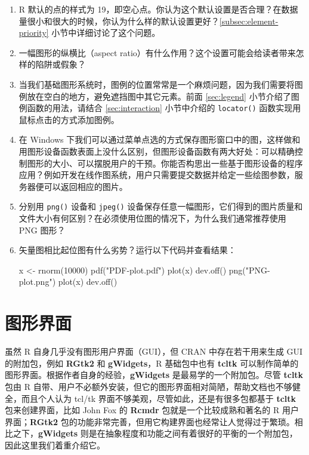 \documentclass[
  b5paper,
  UTF8,twoside]{book}
\newenvironment{Shaded}{\begin{snugshade}}{\end{snugshade}}
\newcommand{\DecValTok}[1]{\textcolor[rgb]{0.00,0.00,0.81}{#1}}
\newcommand{\FunctionTok}[1]{\textcolor[rgb]{0.00,0.00,0.00}{#1}}
\newcommand{\NormalTok}[1]{#1}
\newcommand{\OtherTok}[1]{\textcolor[rgb]{0.56,0.35,0.01}{#1}}
\newcommand{\StringTok}[1]{\textcolor[rgb]{0.31,0.60,0.02}{#1}}
\begin{document}
\begin{enumerate}
\def\labelenumi{\arabic{enumi}.}
\item
  R 默认的点的样式为 19，即空心点。你认为这个默认设置是否合理？在数据量很小和很大的时候，你认为什么样的默认设置更好？\ref{subsec:element-priority} 小节中详细讨论了这个问题。
\item
  一幅图形的纵横比（aspect ratio）有什么作用？这个设置可能会给读者带来怎样的陷阱或假象？
\item
  当我们基础图形系统时，图例的位置常常是一个麻烦问题，因为我们需要将图例放在空白的地方，避免遮挡图中其它元素。前面 \ref{sec:legend} 小节介绍了图例函数的用法，请结合 \ref{sec:interaction} 小节中介绍的 \texttt{locator()} 函数实现用鼠标点击的方式添加图例。
\item
  在 Windows 下我们可以通过菜单点选的方式保存图形窗口中的图，这样做和用图形设备函数表面上没什么区别，但图形设备函数有两大好处：可以精确控制图形的大小、可以摆脱用户的干预。你能否构思出一些基于图形设备的程序应用？例如开发在线作图系统，用户只需要提交数据并给定一些绘图参数，服务器便可以返回相应的图片。
\item
  分别用 \texttt{png()} 设备和 \texttt{jpeg()} 设备保存任意一幅图形，它们得到的图片质量和文件大小有何区别？在必须使用位图的情况下，为什么我们通常推荐使用 PNG 图形？
\item
  矢量图相比起位图有什么劣势？运行以下代码并查看结果：

\begin{Shaded}
\begin{Highlighting}[]
\NormalTok{x }\OtherTok{\textless{}{-}} \FunctionTok{rnorm}\NormalTok{(}\DecValTok{10000}\NormalTok{)}
\FunctionTok{pdf}\NormalTok{(}\StringTok{"PDF{-}plot.pdf"}\NormalTok{)}
\FunctionTok{plot}\NormalTok{(x)}
\FunctionTok{dev.off}\NormalTok{()}
\FunctionTok{png}\NormalTok{(}\StringTok{"PNG{-}plot.png"}\NormalTok{)}
\FunctionTok{plot}\NormalTok{(x)}
\FunctionTok{dev.off}\NormalTok{()}
\end{Highlighting}
\end{Shaded}
\end{enumerate}

\hypertarget{cha:GUI}{%
\chapter{图形界面}\label{cha:GUI}}

虽然 R 自身几乎没有图形用户界面（GUI），但 CRAN 中存在若干用来生成 GUI 的附加包，例如 \textbf{RGtk2} 和 \textbf{gWidgets}，R 基础包中也有 \textbf{tcltk} 可以制作简单的图形界面。根据作者自身的经验，\textbf{gWidgets} 是最易学的一个附加包。尽管 \textbf{tcltk} 包由 R 自带、用户不必额外安装，但它的图形界面相对简陋，帮助文档也不够健全，而且个人认为 tcl/tk 界面不够美观，尽管如此，还是有很多包都基于 \textbf{tcltk} 包来创建界面，比如 John Fox 的 \textbf{Rcmdr} \citep{Rcmdr} 包就是一个比较成熟和著名的 R 用户界面；\textbf{RGtk2} 包的功能非常完善，但用它构建界面也经常让人觉得过于繁琐。相比之下，\textbf{gWidgets} 则是在抽象程度和功能之间有着很好的平衡的一个附加包，因此这里我们着重介绍它。
\end{document}
